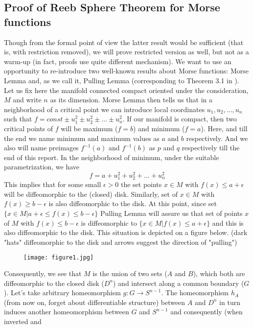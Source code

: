 \documentclass[8pt]{article} %
\begin{document}
\subsection{Proof of Reeb Sphere Theorem for Morse functions}
Though
from the formal point of view the latter result would be sufficient (that is, with restriction removed), we will prove restricted version as well,
but not as a warm-up (in fact, proofs use quite different mechanism). We want to use an opportunity to re-introduce two well-known results
about Morse functions: Morse Lemma and, as we call it, Pulling Lemma (corresponding to Theorem 3.1 in \cite{morseTh}).\\
Let us fix here the manifold connected compact oriented
under the consideration, $M$ and write $n$ as its dimension. 
Morse Lemma then tells us that in a neighborhood of a critical point we can introduce local coordinates $u_1,u_2,\dots,u_n$ such that
$f=const\pm u_1^2\pm u_2^2\pm\dots\pm u_n^2$. If our manifold is compact, then two critical points of $f$ will be maximum ($f=b$) and minimum ($f=a$). Here, and till the end we name minimum and maximum values as $a$ and $b$ respectively. And we also will name preimages $f^{-1}(a)$ and
$f^{-1}(b)$ as $p$ and $q$ respectively till the end of this report.
In the neighborhood of minimum, under the suitable parametrization, we have
\[f=a+u_1^2+u_2^2+\dots+u_n^2\]
This implies that for some small $\epsilon>0$ the set points $x\in M$ with $f(x)\leq a+\epsilon$ will be diffeomorphic to the (closed) disk. Similarly, set of $x\in M$ with $f(x)\geq b-\epsilon$ is also diffeomorphic to the disk.
At this point, since set $\{x\in M|a+\epsilon\leq f(x) \leq b-\epsilon\}$ Pulling Lemma will assure us that set of points $x$ of $M$ with $f(x)\leq b-\epsilon$ is diffeomorphic to $\{x\in M|f(x)\leq a+\epsilon\}$ and this is
also diffeomorphic to the disk. This situation is depicted on a figure below. (dark "hats" diffeomorphic to the disk and arrows suggest the direction of "pulling")\\
\begin{figure}[H]
\centering
\texttt{[image: figure1.jpg]}
\caption{}
\end{figure}
Consequently, we see that $M$ is the union of two sets ($A$ and $B$), which both are diffeomorphic to the closed disk ($D^n$) and intersect along a common boundary ($G$). Let's take arbitrary homeomorphism $g:G\rightarrow S^{n-1}$.
The homeomorphism $h_A$ (from now on, forget about differentiable structure) between $A$ and $D^n$ in turn induces another homeomorphism between $G$ and $S^{n-1}$ and consequently (when inverted and
\end{document}
